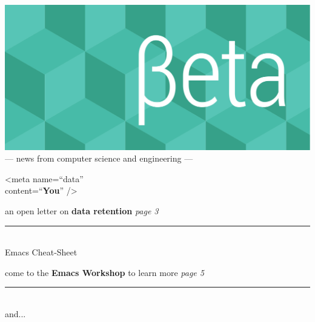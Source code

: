 \documentclass[twoside]{article}
\date{11 May 2015}
\begin{document}
\thispagestyle{empty}
\begingroup%
\vspace*{-3.5cm}\centering\hspace*{-2.8cm}%
\includegraphics[trim=0mm 20mm 0mm 0mm, clip, width=22cm]{../../style/beta-logo.pdf}%
\vspace{1em}
{\sffamily\fontsize{32pt}{32pt}\selectfont --- news from computer science and engineering ---}
\endgroup\vspace*{3ex}

{\sffamily\fontsize{60pt}{66pt}\selectfont <meta name=``data''\\\hspace*{\fill} content=``\textbf{You}'' />}

\center%
{\sffamily\fontsize{32pt}{32pt}\selectfont an open letter on \textbf{data retention}}%
\hfill{\rmfamily\fontsize{14pt}{14pt}\selectfont\it page 3}%
\endcenter

\vfill\center\rule[4pt]{0.75\linewidth}{0.75pt}\\
\vfill{\sffamily\fontsize{48pt}{56pt}\selectfont Emacs Cheat-Sheet}

\center%
{\sffamily\fontsize{32pt}{32pt}\selectfont come to the \textbf{Emacs Workshop} to learn more}%
\hfill{\rmfamily\fontsize{14pt}{14pt}\selectfont\it page 5}%
\endcenter


\vfill\center\rule[4pt]{0.75\linewidth}{0.75pt}\\ {\sffamily\fontsize{24pt}{24pt}\selectfont and...}\endcenter\vfill
\end{document}
